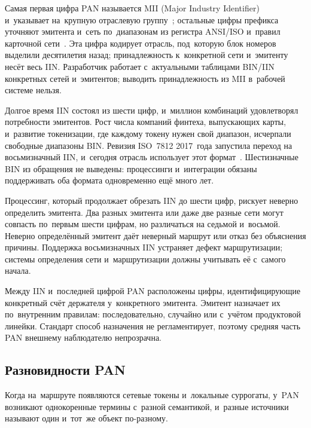 Самая первая цифра PAN называется MII (Major Industry Identifier) и~указывает
на~крупную отраслевую группу~\cite{iso-7812-1}; остальные цифры префикса уточняют эмитента
и~сеть по~диапазонам из регистра ANSI/ISO и~правил карточной
сети~\cite{iso-7812-2,ansi-iin}. Эта цифра кодирует отрасль, под~которую
блок номеров выделили десятилетия назад; принадлежность к~конкретной сети
и~эмитенту несёт весь IIN. Разработчик работает с~актуальными таблицами BIN/IIN
конкретных сетей и~эмитентов; выводить принадлежность из MII в~рабочей системе
нельзя.

Долгое время IIN состоял из шести цифр, и~миллион комбинаций удовлетворял потребности
эмитентов. Рост числа компаний финтеха, выпускающих карты, и~развитие
токенизации, где каждому токену нужен свой диапазон, исчерпали свободные
диапазоны BIN. Ревизия ISO~7812 2017~года запустила переход на восьмизначный
IIN, и~сегодня отрасль использует этот формат~\cite{iso-7812-1,iso-7812-transition}.
Шестизначные BIN из обращения не выведены: процессинги и~интеграции обязаны
поддерживать оба формата одновременно ещё много лет.

Процессинг, который продолжает обрезать IIN до шести цифр, рискует неверно
определить эмитента. Два разных эмитента или даже две разные сети могут
совпасть по~первым шести цифрам, но различаться на седьмой и~восьмой. Неверно
определённый эмитент даёт неверный маршрут или отказ без объяснения причины.
Поддержка восьмизначных IIN устраняет дефект маршрутизации; системы определения
сети и~маршрутизации должны учитывать её с~самого начала.

Между IIN и~последней цифрой PAN расположены цифры, идентифицирующие конкретный
счёт держателя у~конкретного эмитента. Эмитент назначает их по~внутренним
правилам: последовательно, случайно или с~учётом продуктовой линейки. Стандарт
способ назначения не регламентирует, поэтому средняя часть PAN внешнему
наблюдателю непрозрачна.

\subsection*{Разновидности PAN}\label{sec:card-data-pan-variants}

Когда на~маршруте появляются сетевые токены и~локальные суррогаты, у~PAN
возникают однокоренные термины с~разной семантикой, и~разные источники называют
один и~тот~же объект по-разному.

